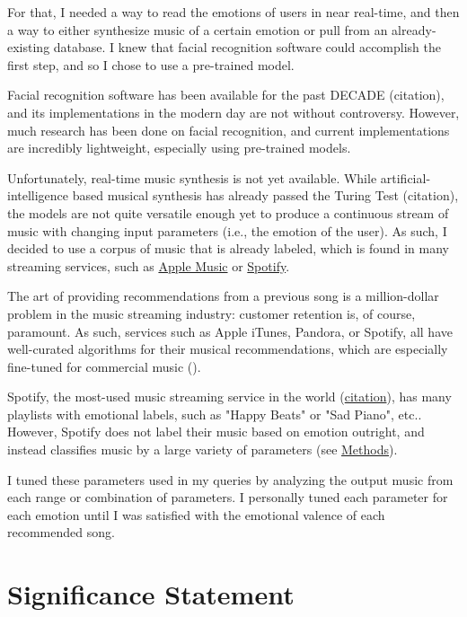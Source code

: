 \documentclass{article}
\renewcommand{\_}[1]{\underline{ #1 }}
\theoremstyle{definition}
\begin{document}
For that, I needed a way to read the emotions of users in near real-time, and then a way to either synthesize music of a certain emotion or pull from an already-existing database. I knew that facial recognition software could accomplish the first step, and so I chose to use a pre-trained model.

Facial recognition software has been available for the past DECADE (citation), and its implementations in the modern day are not without controversy. However, much research has been done on facial recognition, and current implementations are incredibly lightweight, especially using pre-trained models. 

Unfortunately, real-time music synthesis is not yet available. While artificial-intelligence based musical synthesis has already passed the Turing Test (citation), the models are not quite versatile enough yet to produce a continuous stream of music with changing input parameters (i.e., the emotion of the user). As such, I decided to use a corpus of music that is already labeled, which is found in many streaming services, such as \href{https://www.apple.com/apple-music/}{Apple Music} or \href{https://www.spotify.com/us/}{Spotify}.

The art of providing recommendations from a previous song is a million-dollar problem in the music streaming industry: customer retention is, of course, paramount. As such, services such as Apple iTunes, Pandora, or Spotify, all have well-curated algorithms for their musical recommendations, which are especially fine-tuned for commercial music (\cite{drott2018}). 

Spotify, the most-used music streaming service in the world (\href{https://www.midiaresearch.com/blog/music-subscriber-market-shares-q2-2021}{citation}), has many playlists with emotional labels, such as "Happy Beats" or "Sad Piano", etc.. However, Spotify does not label their music based on emotion outright, and instead classifies music by a large variety of parameters (see \hyperref[Methods]{Methods}). 

I tuned these parameters used in my queries by analyzing the output music from each range or combination of parameters. I personally tuned each parameter for each emotion until I was satisfied with the emotional valence of each recommended song.

\section[Significance Statement]{Significance Statement}
\end{document}
